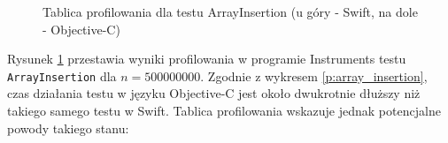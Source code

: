 \documentclass[mgr, shortabstract]{iithesis}
\begin{document}
\begin{figure}
    \caption{Tablica profilowania dla testu ArrayInsertion (u góry - Swift, na dole - Objective-C)}
    \label{i:array_insertion}
\end{figure}

Rysunek \ref{i:array_insertion} przestawia wyniki profilowania w programie Instruments testu \texttt{ArrayInsertion} dla $n = 500000000$. Zgodnie z wykresem \ref{p:array_insertion}, czas działania testu w języku Objective-C jest około dwukrotnie dłuższy niż takiego samego testu w Swift. Tablica profilowania wskazuje jednak potencjalne powody takiego stanu:
\end{document}
